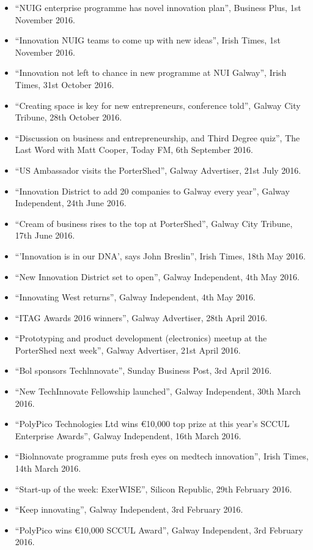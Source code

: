 \documentclass[10pt,a4paper]{res} %
\begin{document}
\begin{resume}
{\begin{itemize}
\item ``NUIG enterprise programme has novel innovation plan'', Business Plus, 1st November 2016.
\item ``Innovation NUIG teams to come up with new ideas'', Irish Times, 1st November 2016.
\item ``Innovation not left to chance in new programme at NUI Galway'', Irish Times, 31st October 2016.
\item ``Creating space is key for new entrepreneurs, conference told'', Galway City Tribune, 28th October 2016.
\item ``Discussion on business and entrepreneurship, and Third Degree quiz'', The Last Word with Matt Cooper, Today FM, 6th September 2016.
\item ``US Ambassador visits the PorterShed'', Galway Advertiser, 21st July 2016.
\item ``Innovation District to add 20 companies to Galway every year'', Galway Independent, 24th June 2016.
\item ``Cream of business rises to the top at PorterShed'', Galway City Tribune, 17th June 2016.
\item ``'Innovation is in our DNA', says John Breslin'', Irish Times, 18th May 2016.
\item ``New Innovation District set to open'', Galway Independent, 4th May 2016.
\item ``Innovating West returns'', Galway Independent, 4th May 2016.
\item ``ITAG Awards 2016 winners'', Galway Advertiser, 28th April 2016.
\item ``Prototyping and product development (electronics) meetup at the PorterShed next week'', Galway Advertiser, 21st April 2016.
\item ``Bol sponsors Techlnnovate'', Sunday Business Post, 3rd April 2016.
\item ``New TechInnovate Fellowship launched'', Galway Independent, 30th March 2016.
\item ``PolyPico Technologies Ltd wins \euro{}10,000 top prize at this year's SCCUL Enterprise Awards'', Galway Independent, 16th March 2016.
\item ``Biolnnovate programme puts fresh eyes on medtech innovation'', Irish Times, 14th March 2016.
\item ``Start-up of the week: ExerWISE'', Silicon Republic, 29th February 2016.
\item ``Keep innovating'', Galway Independent, 3rd February 2016.
\item ``PolyPico wins \euro{}10,000 SCCUL Award'', Galway Independent, 3rd February 2016.

\end{itemize}}
\end{resume}
\end{document}
